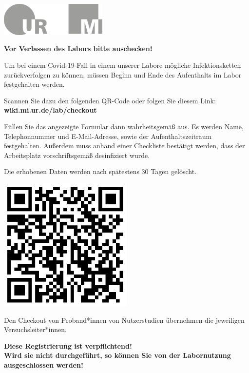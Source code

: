 \documentclass[24pt, a4paper, portrait]{article}
\begin{document}
\pagestyle{empty}

\raggedleft

\includegraphics[width=0.4\textwidth]{logo}

\vspace{1cm}
\sffamily
\centering
\huge

\textbf{Vor Verlassen des Labors bitte auschecken!}

\vspace{1cm}

\raggedright
\Large

Um bei einem Covid-19-Fall in einem unserer Labore mögliche Infektionsketten zurückverfolgen zu können, müssen Beginn und Ende des Aufenthalts im Labor festgehalten werden.

\medskip

Scannen Sie dazu den folgenden QR-Code oder folgen Sie diesem Link: \textbf{wiki.mi.ur.de/lab/checkout}

\medskip

Füllen Sie das angezeigte Formular dann wahrheitsgemäß aus.
Es werden Name, Telephonnummer und E-Mail-Adresse, sowie der Aufenthaltszeitraum festgehalten.
Außerdem muss anhand einer Checkliste bestätigt werden, dass der Arbeitsplatz vorschriftsgemäß desinfiziert wurde.

Die erhobenen Daten werden nach spätestens 30 Tagen gelöscht.

\vspace{1cm}
\centering
\includegraphics[width=0.5\textwidth]{qr/tb_besprechung_checkout}

\vspace{1cm}
\raggedright
Den Checkout von Proband*innen von Nutzerstudien übernehmen die jeweiligen Versuchsleiter*innen.

\vspace{5mm}
\centering
\huge
\textbf{Diese Registrierung ist verpflichtend! \\ Wird sie nicht durchgeführt, so können Sie von der Labornutzung ausgeschlossen werden!}
\end{document}
